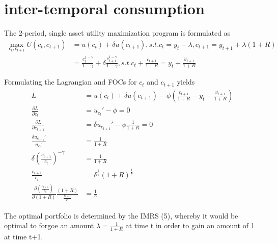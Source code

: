 \documentclass[]{article}
\begin{document}
\section{inter-temporal consumption}
The 2-period, single asset utility maximization program is formulated as
\begin{align*}
	\max_{c_t, c_{t+1}} U(c_t, c_{t+1}) &= u(c_t) + \delta u(c_{t+1}), s.t. c_t = y_t - \lambda, c_{t+1} = y_{t+1} + \lambda (1+R)\\
	&= \frac{c_t^{1-\gamma}}{1-\gamma} + \delta \frac{c_{t+1}^{1-\gamma}}{1-\gamma}, s.t. c_t + \frac{c_{t+1}}{1+R} = y_t + \frac{y_{t+1}}{1+R}
\end{align*}

Formulating the Lagrangian and FOCs for $c_t$ and $c_{t+1}$ yields
\begin{align}
	L &= u(c_t) + \delta u(c_{t+1}) - \phi (\frac{c_{t+1}}{1+R} - y_t - \frac{y_{t+1}}{1+R})\\
	\frac{\partial L}{\partial c_t} &= u_{c_t}' - \phi = 0\\
	\frac{\partial L}{\partial c_{t+1}} &= \delta u_{c_{t+1}}' - \phi \frac{1}{1+R}= 0\\
	\frac{\delta u_{c_{t+1}}'}{u_{c_t}'} &= \frac{1}{1+R}\\
	\delta \left( \frac{c_{t+1}}{c_t} \right)^{-\gamma} &= \frac{1}{1+R}\\
	\frac{c_{t+1}}{c_t} &= \delta^{\frac{1}{\gamma}}(1+R)^{\frac{1}{\gamma}}\\
	\frac{\partial(\frac{c_{t+1}}{c_t})}{\partial(1+R)} \frac{(1+R)}{\frac{c_{t+1}}{c_t}} &= \frac{1}{\gamma}
\end{align}

The optimal portfolio is determined by the IMRS (5), whereby it would be optimal to forgoe an amount $\lambda = \frac{1}{1+R}$ at time t in order to gain an amount of 1 at time t+1. 
\end{document}
